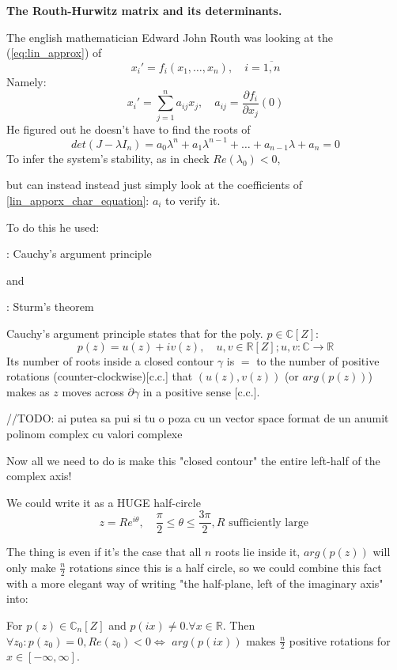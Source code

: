 \textbf{The Routh-Hurwitz matrix and its determinants.}

The english mathematician Edward John Routh was looking at the
(\ref{eq:lin_approx}) of
\[
x_i' = f_i(x_1,\dots , x_n), \quad i = \overline{1,n}
\]
Namely:
\[
x_i' =\sum_{j=1}^{n}a_{ij} x_j, \quad a_{ij} = \frac{\partial
f_i}{\partial x_j}(0)
\]
He figured out he doesn't have to find the roots of
\begin{equation}\label{lin_apporx_char_equation}
det(J - \lambda I_n) = a_0 \lambda^n + a_1 \lambda^{n-1} + \dots +
a_{n-1}\lambda + a_n = 0
\end{equation}
To infer the system's stability, as in check
$ Re(\lambda_0) < 0$,

but can instead instead just simply look at the coefficients of
\ref{lin_apporx_char_equation}: $a_{i}$ to verify it.

To do this he used:

: Cauchy's argument principle

and

: Sturm's theorem


Cauchy's argument principle states that for the poly. $p \in \mathbb{C}[Z]$:
\[
p(z) = u(z) + i v(z), \quad u, v \in \mathbb{R}[Z]; u,v : \mathbb{C}
\rightarrow \mathbb{R}
\]
Its number of roots inside a closed contour $\gamma$  is $=$ to the
number of positive rotations (counter-clockwise)[c.c.] that $(u(z),
v(z))$ (or $arg(p(z))$) makes as $z$ moves across $\partial \gamma$
in a positive sense [c.c.].

//TODO: ai putea sa pui si tu o poza cu un vector space format de un
anumit polinom complex cu valori complexe

Now all we need to do is make this "closed contour" the entire
left-half of the complex axis!

We could write it as a {\large HUGE} half-circle
\[
z = Re^{i \theta}, \quad \frac{\pi}{2} \leq \theta \leq \frac{3
\pi}{2}, R \text{ sufficiently large }
\]

The thing is even if it's the case that all $n$ roots lie inside it,
$arg(p(z))$ will only make $\frac{n}{2}$ rotations since this is a
half circle, so we could combine this fact with a more elegant way of
writing "the half-plane, left of the imaginary axis" into:

\begin{lemma}\label{cauchy_arg_lemma}
For $p(z) \in \mathbb{C}_n[Z]$ and $p(ix) \neq 0. \forall x \in
\mathbb{R}$. Then $\forall z_0 : p(z_0) = 0, Re(z_0) < 0 \iff$
$arg(p(ix))$ makes $\frac{n}{2}$ positive rotations for $x \in
[-\infty , \infty]$.
\end{lemma}

